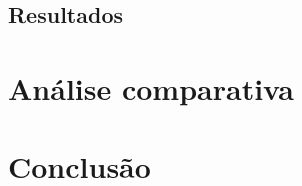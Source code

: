 \documentclass[
	article,			        %
	11pt,				          %
	oneside,			        %
	a4paper,			        %
	english,			        %
	brazil,				        %
	sumario=tradicional
]{abntex2}\usepackage[]{graphicx}\usepackage[]{color}
\begin{document}
\subsection{Resultados}

\section{Análise comparativa}

% 

\section*{Conclusão}



\postextual





\end{document}

